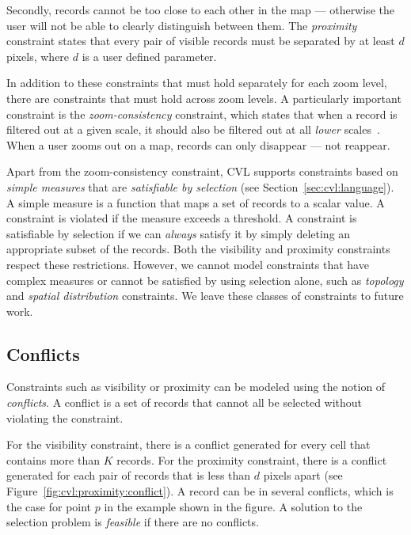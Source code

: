 \documentclass[11pt, oneside]{report}
\begin{document}
Secondly, records cannot be too close to each other in the map --- otherwise the user will not be able to clearly distinguish between them. The \emph{proximity} constraint states that every pair of visible records must be separated by at least $d$ pixels, where $d$ is a user defined parameter.

In addition to these constraints that must hold separately for each zoom level, there are constraints that must hold across zoom levels. A particularly important constraint is the \emph{zoom-consistency} constraint, which states that when a record is filtered out at a given scale, it should also be filtered out at all \emph{lower} scales~\cite{sarma2012fusiontables}. When a user zooms out on a map, records can only disappear --- not reappear.

Apart from the zoom-consistency constraint, CVL supports constraints based on \emph{simple measures} that are \emph{satisfiable by selection} (see Section~\ref{sec:cvl:language}). A simple measure is a function that maps a set of records to a scalar value. A constraint is violated if the measure exceeds a threshold. A constraint is satisfiable by selection if we can \emph{always} satisfy it by simply deleting an appropriate subset of the records. Both the visibility and proximity constraints respect these restrictions. However, we cannot model constraints that have complex measures or cannot be satisfied by using selection alone, such as \emph{topology} and \emph{spatial distribution} constraints. We leave these classes of constraints to future work.

\subsection{Conflicts}
\label{sec:cvl:conflicts}

Constraints such as visibility or proximity can be modeled using the notion of \emph{conflicts}. A conflict is a set of records that cannot all be selected without violating the constraint.

For the visibility constraint, there is a conflict generated for every cell that contains more than $K$ records. For the proximity constraint, there is a conflict generated for each pair of records that is less than $d$ pixels apart (see Figure~\ref{fig:cvl:proximity:conflict}). A record can be in several conflicts, which is the case for point $p$ in the example shown in the figure. A solution to the selection problem is \emph{feasible} if there are no conflicts.
\end{document}
